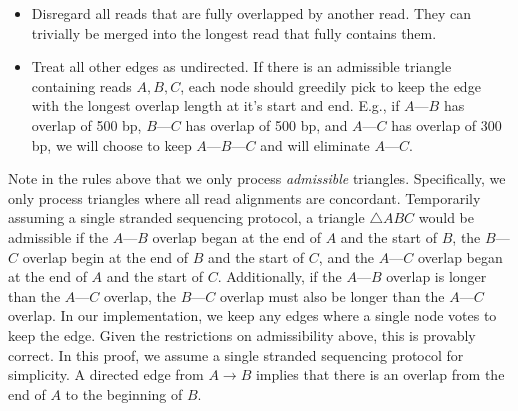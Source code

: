 \documentclass[11pt]{article}
\theoremstyle{plain}
\begin{document}
\begin{itemize}
\item Disregard all reads that are fully overlapped by another read. They can trivially be
merged into the longest read that fully contains them.
\item Treat all other edges as undirected. If there is an admissible triangle containing
reads $A, B, C$, each node should greedily pick to keep the edge with the longest overlap
length at it's start and end. E.g., if $A$---$B$ has overlap of 500 bp, $B$---$C$ has overlap
of 500 bp, and $A$---$C$ has overlap of 300 bp, we will choose to keep $A$---$B$---$C$ and
will eliminate $A$---$C$.
\end{itemize}

Note in the rules above that we only process \emph{admissible} triangles. Specifically,
we only process triangles where all read alignments are concordant. Temporarily assuming
a single stranded sequencing protocol, a triangle $\triangle ABC$ would be admissible if the
$A$---$B$ overlap began at the end of $A$ and the start of $B$, the $B$---$C$ overlap
begin at the end of $B$ and the start of $C$, and the $A$---$C$ overlap began at the
end of $A$ and the start of $C$. Additionally, if the $A$---$B$ overlap is longer than
the $A$---$C$ overlap, the $B$---$C$ overlap must also be longer than the $A$---$C$
overlap. In our implementation, we keep any edges where a single node votes to keep the
edge. Given the restrictions on admissibility above, this is provably correct. In this
proof, we assume a single stranded sequencing protocol for simplicity. A directed edge
from $A \rightarrow B$ implies that there is an overlap from the end of $A$ to the
beginning of $B$.
\end{document}
